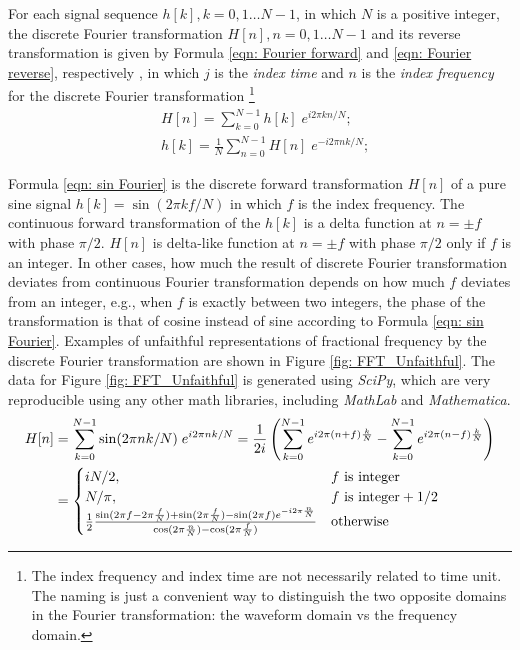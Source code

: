 \documentclass[twoside]{article}
\numberwithin{equation}{section}
\begin{document}
For each signal sequence $h[k], k = 0, 1 \dots  N-1$, in which $N$ is a positive integer, the discrete Fourier transformation $H[n], n = 0, 1 \dots  N-1$ and its reverse transformation is given by Formula \eqref{eqn: Fourier forward} and \eqref{eqn: Fourier reverse}, respectively  \cite{Numerical_Recipes}, in which $j$ is the \emph{index time} and $n$ is the \emph{index frequency} for the discrete Fourier transformation
\footnote{The index frequency and index time are not necessarily related to time unit.  
The naming is just a convenient way to distinguish the two opposite domains in the Fourier transformation: the waveform domain vs the frequency domain.}
\begin{align}
\label{eqn: Fourier forward}
& H[n]=\sum_{k=0}^{N-1} h[k] \; e^{i 2\pi k n/N}; \\
\label{eqn: Fourier reverse}
& h[k]=\frac{1}{N} \sum_{n=0}^{N-1} H[n] \; e^{-i 2\pi n k/N};
\end{align}

Formula \eqref{eqn: sin Fourier} is the discrete forward transformation $H[n]$ of a pure sine signal $h[k] = \sin(2\pi k f/N)$ in which $f$ is the index frequency.
The continuous forward transformation of the $h[k]$ is a delta function at $n = \pm f$ with phase $\pi/2$.
$H[n]$ is delta-like function at $n = \pm f$ with phase $\pi/2$ only if $f$ is an integer.
In other cases, how much the result of discrete Fourier transformation deviates from continuous Fourier transformation depends on how much $f$ deviates from an integer, e.g., when $f$ is exactly between two integers, the phase of the transformation is that of cosine instead of sine according to Formula \eqref{eqn: sin Fourier}.
Examples of unfaithful representations of fractional frequency by the discrete Fourier transformation are shown in Figure \ref{fig: FFT_Unfaithful}. 
The data for Figure \ref{fig: FFT_Unfaithful} is generated using \textit{SciPy}, which are very reproducible using any other math libraries, including \textit{MathLab} and \textit{Mathematica}.
\begin{align}
\centering
H[n] &=\sum_{k=0}^{N-1} \sin(2\pi n k/N) \; e^{i 2\pi n k/N} =
  \frac{1}{2 i} \left( \sum_{k=0}^{N-1} e^{i 2\pi (n+f)\frac{k}{N}}  - \sum_{k=0}^{N-1} e^{i 2\pi (n-f)\frac{k}{N}} \right) \nonumber \\
\label{eqn: sin Fourier}
&= \begin{cases}
  i N/2, & f \text{ is integer} \\
  N/\pi, & f \text{ is integer} + 1/2 \\
  \frac{1}{2} \frac{\sin(2\pi f - 2\pi \frac{f}{N}) + \sin(2\pi \frac{f}{N})-\sin(2\pi f) e^{-i 2\pi \frac{n}{N}}}{\cos(2\pi \frac{n}{N})-\cos(2\pi \frac{f}{N})} & \text{otherwise}
\end{cases}
\end{align}
\end{document}
